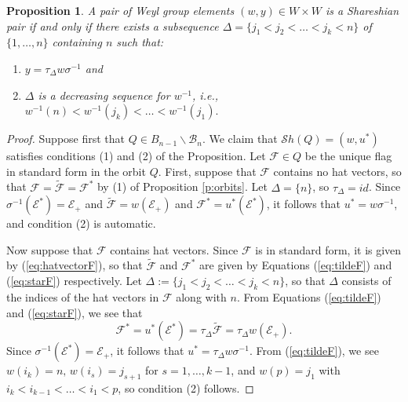 \documentclass[12pt]{amsart}
\numberwithin{equation}{section}
\newtheorem{prop}[thm]{Proposition}
\newcommand{\B}{\mathcal{B}}
\newcommand{\F}{\mathcal{F}}
\newcommand{\Borbitspace}{B_{n-1}\backslash\B_{n}}
\newcommand{\Sh}{\mathcal{S}h}
\begin{document}
\begin{prop}\label{p:Shpairs}
 A pair of Weyl group elements 
$(w, y)\in W\times W$ is a Shareshian pair if and only if there exists a subsequence $\Delta = \{j_{1}<j_{2}<\dots<j_{k}<n\}$ of $\{1,\dots, n\}$ containing $n$ such that: 
\begin{enumerate}
\item $y=\tau_{\Delta}w\sigma^{-1}$ and
\item $\Delta$ is a decreasing sequence for $w^{-1}$, i.e., $w^{-1}(n)<w^{-1}(j_{k})<\dots <w^{-1}(j_{1}).$
\end{enumerate}
\end{prop}
\begin{proof}
Suppose first that $Q\in\Borbitspace$.  We claim that $\Sh(Q)=(w,u^{*})$ satisfies conditions (1) and (2) of the
Proposition.  Let $\F\in Q$ be the unique flag in standard form in the orbit $Q$.  First, suppose that 
$\F$ contains no hat vectors, so that $\F=\tilde{\F}=\F^{*}$ by (1) of Proposition \ref{p:orbits}.  Let $\Delta=\{n\}$, so $\tau_{\Delta}=id$.  Since $\sigma^{-1}(\mathcal{E}^{*})=\mathcal{E_{+}}$ and $\tilde{\F}=w(\mathcal{E}_{+})$ and $\F^{*}=u^{*}(\mathcal{E}^{*})$, it follows that $u^{*}=w\sigma^{-1}$, and condition (2) is automatic.

Now suppose that $\F$ contains hat vectors.  Since $\F$ is in standard form, it is  given by (\ref{eq:hatvectorF}), so that $\tilde{\F}$ and $\F^{*}$ are given by Equations (\ref{eq:tildeF}) and (\ref{eq:starF}) 
respectively.  Let $\Delta:=\{j_{1}<j_{2}<\dots<j_{k}<n\}$, so that $\Delta$ consists of the indices of the hat 
vectors in $\F$ along with $n$.  
From Equations (\ref{eq:tildeF}) and (\ref{eq:starF}), we see that $$\F^{*}=u^{*}(\mathcal{E}^{*})=\tau_{\Delta}\tilde{\F}=\tau_{\Delta} w (\mathcal{E}_{+}).$$  
Since $\sigma^{-1}(\mathcal{E}^{*})=\mathcal{E}_{+}$, it follows that $u^{*}=\tau_{\Delta}w\sigma^{-1}$.   From (\ref{eq:tildeF}), we see $w(i_{k})=n,\, w(i_{s})=j_{s+1}$ for $s=1,\dots, k-1$, and $w(p)=j_{1}$ with $i_k < i_{k-1} < \dots < i_1 < p$, so condition (2) follows.



\end{proof}
\end{document}

